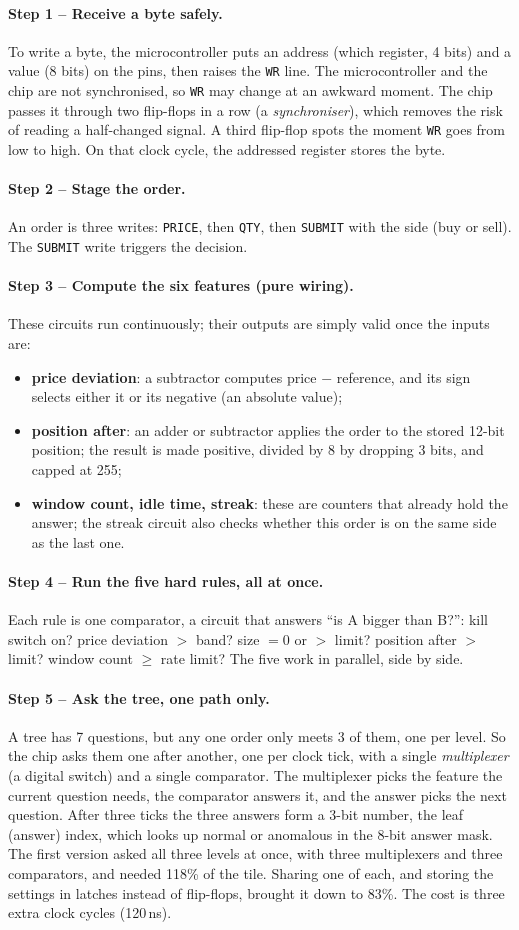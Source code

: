 \documentclass[11pt,a4paper]{article}
\newcommand{\code}[1]{\texttt{#1}}
\newcommand{\step}[2]{\paragraph{Step #1 -- #2.}}
\begin{document}
\step{1}{Receive a byte safely}
To write a byte, the microcontroller puts an address (which register, 4 bits) and a value (8 bits)
on the pins, then raises the \code{WR} line. The microcontroller and the chip are not
synchronised, so \code{WR} may change at an awkward moment. The chip passes it through two
flip-flops in a row (a \emph{synchroniser}), which removes the risk of reading a half-changed
signal. A third flip-flop spots the moment \code{WR} goes from low to high. On that clock cycle,
the addressed register stores the byte.

\step{2}{Stage the order}
An order is three writes: \code{PRICE}, then \code{QTY}, then \code{SUBMIT} with the side
(buy or sell). The \code{SUBMIT} write triggers the decision.

\step{3}{Compute the six features (pure wiring)}
These circuits run continuously; their outputs are simply valid once the inputs are:
\begin{itemize}
  \item \textbf{price deviation}: a subtractor computes price $-$ reference, and its sign selects
        either it or its negative (an absolute value);
  \item \textbf{position after}: an adder or subtractor applies the order to the stored 12-bit
        position; the result is made positive, divided by 8 by dropping 3 bits, and capped at 255;
  \item \textbf{window count, idle time, streak}: these are counters that already hold the answer;
        the streak circuit also checks whether this order is on the same side as the last one.
\end{itemize}

\step{4}{Run the five hard rules, all at once}
Each rule is one comparator, a circuit that answers ``is A bigger than B?'':
kill switch on? price deviation $>$ band? size $= 0$ or $>$ limit? position after $>$ limit?
window count $\ge$ rate limit? The five work in parallel, side by side.

\step{5}{Ask the tree, one path only}
A tree has 7 questions, but any one order only meets 3 of them, one per level. So the chip asks
them one after another, one per clock tick, with a single \emph{multiplexer} (a digital switch)
and a single comparator. The multiplexer picks the feature the current question needs, the
comparator answers it, and the answer picks the next question. After three ticks the three
answers form a 3-bit number, the leaf (answer) index, which looks up normal or anomalous in the
8-bit answer mask. The first version asked all three levels at once, with three multiplexers and
three comparators, and needed 118\% of the tile. Sharing one of each, and storing the settings in
latches instead of flip-flops, brought it down to 83\%. The cost is three extra clock cycles
(120\,ns).
\end{document}
